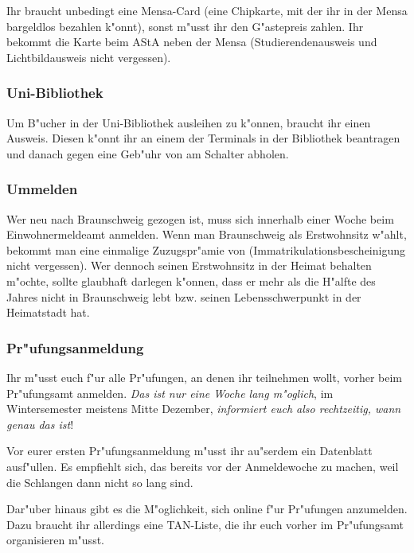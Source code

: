 Ihr braucht unbedingt eine Mensa-Card (eine Chipkarte,
mit der ihr in der Mensa bargeldlos bezahlen k"onnt), sonst
m"usst ihr den G"astepreis zahlen. Ihr bekommt die Karte beim
AStA neben der Mensa (Studierendenausweis und Lichtbildausweis
nicht vergessen).

\subsubsection{Uni-Bibliothek}

Um B"ucher in der Uni-Bibliothek ausleihen zu k"onnen, braucht ihr
einen Ausweis. Diesen k"onnt ihr an einem der Terminals in der
Bibliothek beantragen und danach gegen eine Geb"uhr von 
am Schalter abholen.

\subsubsection{Ummelden}

Wer neu nach Braunschweig gezogen ist, muss sich innerhalb einer
Woche beim Einwohnermeldeamt anmelden. Wenn man Braunschweig als
Erstwohnsitz w"ahlt, bekommt man eine einmalige Zuzugspr"amie von
 (Immatrikulationsbescheinigung nicht vergessen). Wer
dennoch seinen Erstwohnsitz in der Heimat behalten m"ochte, sollte
glaubhaft darlegen k"onnen, dass er mehr als die H"alfte des Jahres
nicht in Braunschweig lebt bzw. seinen Lebensschwerpunkt in der
Heimatstadt hat.

\subsubsection{Pr"ufungsanmeldung}

Ihr m"usst euch f"ur alle Pr"ufungen, an denen ihr teilnehmen
wollt, vorher beim Pr"ufungsamt anmelden. \emph{Das ist nur eine
Woche lang m"oglich}, im Wintersemester meistens Mitte Dezember,
\emph{informiert euch also rechtzeitig, wann genau das ist}!

Vor eurer ersten Pr"ufungsanmeldung m"usst ihr au"serdem ein
Datenblatt ausf"ullen. Es empfiehlt sich, das bereits vor der
Anmeldewoche zu machen, weil die Schlangen dann nicht so lang sind.

Dar"uber hinaus gibt es die M"oglichkeit, sich online f"ur
Pr"ufungen anzumelden. Dazu braucht ihr allerdings eine TAN-Liste,
die ihr euch vorher im Pr"ufungsamt organisieren m"usst.

